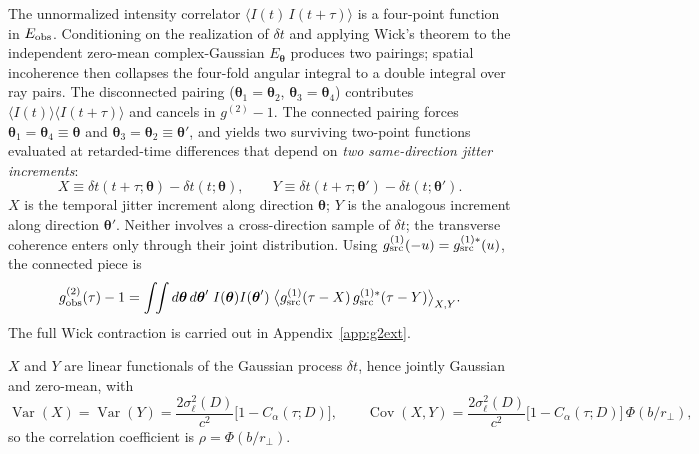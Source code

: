 \documentclass[aps,prd,onecolumn,amsmath,amssymb]{revtex4-2}
\begin{document}
The unnormalized intensity correlator $\langle I(t)\,I(t+\tau)\rangle$ is a
four-point function in $E_{\rm obs}$.  Conditioning on the realization of
$\delta t$ and applying Wick's theorem to the independent zero-mean
complex-Gaussian $E_{\boldsymbol{\theta}}$ produces two pairings; spatial
incoherence then collapses the four-fold angular integral to a double
integral over ray pairs.  The disconnected pairing
($\boldsymbol{\theta}_1=\boldsymbol{\theta}_2$,
$\boldsymbol{\theta}_3=\boldsymbol{\theta}_4$) contributes
$\langle I(t)\rangle\langle I(t+\tau)\rangle$ and cancels in $g^{(2)}-1$.
The connected pairing forces $\boldsymbol{\theta}_1=\boldsymbol{\theta}_4
\equiv\boldsymbol{\theta}$ and $\boldsymbol{\theta}_3=\boldsymbol{\theta}_2
\equiv\boldsymbol{\theta}'$, and yields two surviving two-point functions
evaluated at retarded-time differences that depend on \emph{two
same-direction jitter increments}:
\begin{equation}
  X \equiv \delta t(t+\tau;\boldsymbol{\theta}) - \delta t(t;\boldsymbol{\theta}),
  \qquad
  Y \equiv \delta t(t+\tau;\boldsymbol{\theta}') - \delta t(t;\boldsymbol{\theta}').
  \label{eq:XYdef}
\end{equation}
$X$ is the temporal jitter increment along direction $\boldsymbol{\theta}$;
$Y$ is the analogous increment along direction $\boldsymbol{\theta}'$.
Neither involves a cross-direction sample of $\delta t$; the transverse
coherence enters only through their joint distribution.  Using
$g^{(1)}_{\rm src}(-u) = g^{(1)*}_{\rm src}(u)$, the connected piece is
\begin{equation}
  g^{(2)}_{\rm obs}(\tau) - 1
    = \int\!\!\int d\boldsymbol{\theta}\,d\boldsymbol{\theta}'\;
      I(\boldsymbol{\theta})I(\boldsymbol{\theta}')\;
      \big\langle g^{(1)}_{\rm src}(\tau - X)\,
                 g^{(1)*}_{\rm src}(\tau - Y)\big\rangle_{X,Y}.
  \label{eq:g2ext_correct}
\end{equation}
The full Wick contraction is carried out in Appendix~\ref{app:g2ext}.

$X$ and $Y$ are linear functionals of the Gaussian process $\delta t$,
hence jointly Gaussian and zero-mean, with
\begin{equation}
  \operatorname{Var}(X) = \operatorname{Var}(Y)
    = \frac{2\sigma_\ell^2(D)}{c^2}\big[1 - C_\alpha(\tau;D)\big], \qquad
  \operatorname{Cov}(X,Y)
    = \frac{2\sigma_\ell^2(D)}{c^2}\big[1 - C_\alpha(\tau;D)\big]\,
       \Phi(b/r_\perp),
  \label{eq:XYvar}
\end{equation}
so the correlation coefficient is $\rho = \Phi(b/r_\perp)$.
\end{document}
